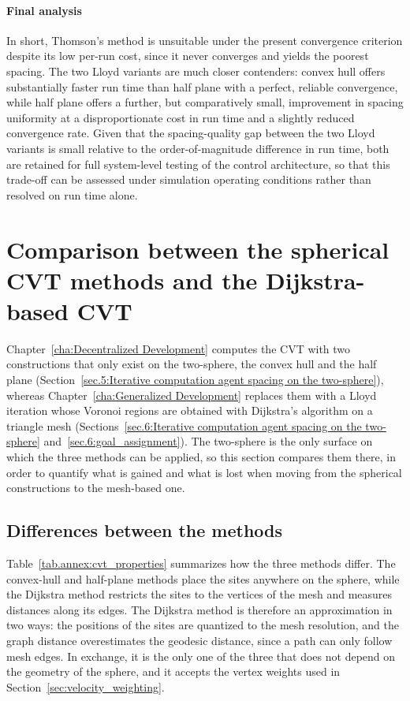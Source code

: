 \paragraph{Final analysis} In short, Thomson's method is unsuitable under the present convergence criterion despite its low per-run cost, since it never converges and yields the poorest spacing. The two Lloyd variants are much closer contenders: convex hull offers substantially faster run time than half plane with a perfect, reliable convergence, while half plane offers a further, but comparatively small, improvement in spacing uniformity at a disproportionate cost in run time and a slightly reduced convergence rate. Given that the spacing-quality gap between the two Lloyd variants is small relative to the order-of-magnitude difference in run time, both are retained for full system-level testing of the control architecture, so that this trade-off can be assessed under simulation operating conditions rather than resolved on run time alone.

\section{Comparison between the spherical CVT methods and the Dijkstra-based CVT} \label{annex:Comparison between the spherical CVT methods and the Dijkstra-based CVT}

Chapter~\ref{cha:Decentralized Development} computes the \gls{CVT} with two constructions that only exist on the two-sphere, the convex hull and the half plane (Section~\ref{sec.5:Iterative computation agent spacing on the two-sphere}), whereas Chapter~\ref{cha:Generalized Development} replaces them with a Lloyd iteration whose Voronoi regions are obtained with Dijkstra's algorithm on a triangle mesh (Sections~\ref{sec.6:Iterative computation agent spacing on the two-sphere} and~\ref{sec.6:goal_assignment}). The two-sphere is the only surface on which the three methods can be applied, so this section compares them there, in order to quantify what is gained and what is lost when moving from the spherical constructions to the mesh-based one.

\subsection{Differences between the methods}

Table~\ref{tab.annex:cvt_properties} summarizes how the three methods differ. The convex-hull and half-plane methods place the sites anywhere on the sphere, while the Dijkstra method restricts the sites to the vertices of the mesh and measures distances along its edges. The Dijkstra method is therefore an approximation in two ways: the positions of the sites are quantized to the mesh resolution, and the graph distance overestimates the geodesic distance, since a path can only follow mesh edges. In exchange, it is the only one of the three that does not depend on the geometry of the sphere, and it accepts the vertex weights used in Section~\ref{sec:velocity_weighting}.

